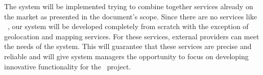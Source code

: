 The system will be implemented trying to combine together services already on the market as presented in the document's scope. Since there are no services like \projectname~, our system will be developed completely from scratch with the exception of geolocation and mapping services. For these services, external providers can meet the needs of the system. This will guarantee that these services are precise and reliable and will give system managers the opportunity to focus on developing innovative functionality for the \projectname~project.